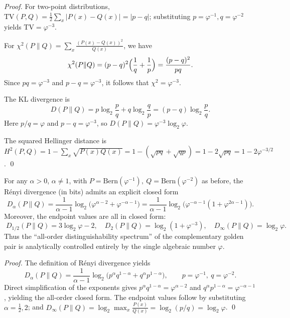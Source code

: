 \begin{proof}
For two-point distributions, \(\mathrm{TV}(P,Q)=\frac12\sum_x|P(x)-Q(x)|=|p-q|\); substituting \(p=\varphi^{-1},q=\varphi^{-2}\) yields \(\mathrm{TV}=\varphi^{-3}\).
\par
For \(\chi^2(P\|Q)=\sum_x \frac{(P(x)-Q(x))^2}{Q(x)}\), we have
\[
\chi^2(P\|Q)=(p-q)^2\Bigl(\frac{1}{q}+\frac{1}{p}\Bigr)=\frac{(p-q)^2}{pq}.
\]
Since \(pq=\varphi^{-3}\) and \(p-q=\varphi^{-3}\), it follows that \(\chi^2=\varphi^{-3}\).
\par
The KL divergence is
\[
D(P\|Q)=p\log_2\frac{p}{q}+q\log_2\frac{q}{p}=(p-q)\log_2\frac{p}{q}.
\]
Here \(p/q=\varphi\) and \(p-q=\varphi^{-3}\), so \(D(P\|Q)=\varphi^{-3}\log_2\varphi\).
\par
The squared Hellinger distance is
\(
H^2(P,Q)=1-\sum_x\sqrt{P(x)Q(x)}=1-(\sqrt{pq}+\sqrt{qp})=1-2\sqrt{pq}=1-2\varphi^{-3/2}
\).
\qed
\end{proof}

\begin{proposition}\label{prop:pom-complementary-golden-bernoulli-renyi-spectrum}
For any \(\alpha>0\), \(\alpha\neq 1\), with
\(
P=\mathrm{Bern}(\varphi^{-1}),\ Q=\mathrm{Bern}(\varphi^{-2})
\) as before,
the R\'enyi divergence (in bits) admits an explicit closed form
\[
\boxed{\;
D_\alpha(P\|Q)
=\frac{1}{\alpha-1}\log_2\!\Big(\varphi^{\alpha-2}+\varphi^{-\alpha-1}\Big)
=\frac{1}{\alpha-1}\log_2\!\Big(\varphi^{-\alpha-1}(1+\varphi^{2\alpha-1})\Big).\;}
\]
Moreover, the endpoint values are all in closed form:
\[
\boxed{\;
D_{1/2}(P\|Q)=3\log_2\varphi-2,\quad
D_{2}(P\|Q)=\log_2(1+\varphi^{-3}),\quad
D_{\infty}(P\|Q)=\log_2\varphi.\;}
\]
Thus the ``all-order distinguishability spectrum'' of the complementary golden pair is analytically controlled entirely by the single algebraic number \(\varphi\).
\end{proposition}

\begin{proof}
The definition of R\'enyi divergence yields
\[
D_\alpha(P\|Q)=\frac{1}{\alpha-1}\log_2\!\Big(p^\alpha q^{1-\alpha}+q^\alpha p^{1-\alpha}\Big),
\qquad p=\varphi^{-1},\ q=\varphi^{-2}.
\]
Direct simplification of the exponents gives
\(
p^\alpha q^{1-\alpha}=\varphi^{\alpha-2}
\) and
\(
q^\alpha p^{1-\alpha}=\varphi^{-\alpha-1}
\),
yielding the all-order closed form.
The endpoint values follow by substituting \(\alpha=\tfrac12,2\); and \(D_\infty(P\|Q)=\log_2\max_x \frac{P(x)}{Q(x)}=\log_2(p/q)=\log_2\varphi\). \qed
\end{proof}

